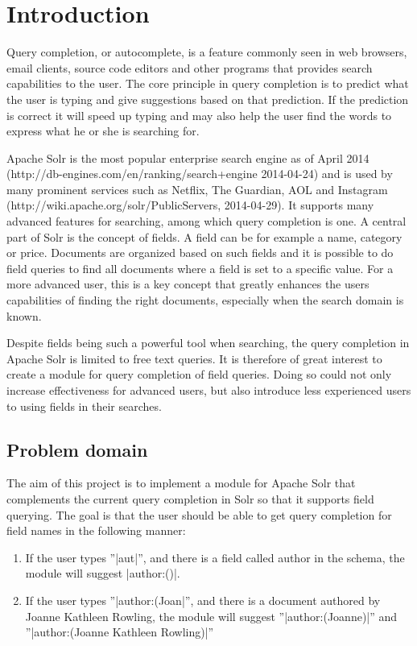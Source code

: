 \section{Introduction}
Query completion, or autocomplete, is a feature commonly seen in web browsers, email clients, source code editors and other programs that provides search capabilities to the user. The core principle in query completion is to predict what the user is typing and give suggestions based on that prediction. If the prediction is correct it will speed up typing and may also help the user find the words to express what he or she is searching for. 

Apache Solr is the most popular enterprise search engine as of April 2014 (http://db-engines.com/en/ranking/search+engine 2014-04-24) and is used by many prominent services such as Netflix, The Guardian, AOL and Instagram (http://wiki.apache.org/solr/PublicServers, 2014-04-29). It supports many advanced features for searching, among which query completion is one. A central part of Solr is the concept of fields. A field can be for example a name, category or price. Documents are organized based on such fields and it is possible to do field queries to find all documents where a field is set to a specific value. For a more advanced user, this is a key concept that greatly enhances the users capabilities of finding the right documents, especially when the search domain is known. 

Despite fields being such a powerful tool when searching, the query completion in Apache Solr is limited to free text queries. It is therefore of great interest to create a module for query completion of field queries. Doing so could not only increase effectiveness for advanced users, but also introduce less experienced users to using fields in their searches.

\subsection{Problem domain}

The aim of this project is to implement a module for Apache Solr that complements the current query completion in Solr so that it supports field querying. The goal is that the user should be able to get query completion for field names in the following manner:

\begin{enumerate}
\item If the user types ''|aut|'', and there is a field called author in the schema, the module will suggest |author:()|. 
\item If the user types ''|author:(Joan|'', and there is a document authored by Joanne Kathleen Rowling, the module will suggest ''|author:(Joanne)|'' and ''|author:(Joanne Kathleen Rowling)|''
\end{enumerate}

